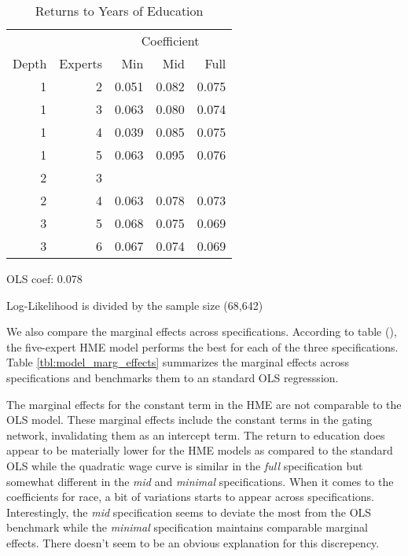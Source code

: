 \documentclass[12pt]{article}
\begin{document}
\begin{table} \centering
  \caption{Returns to Years of Education}
  \begin{threeparttable}
    \begin{tabular}[l]{r r r r r}
  \cmidrule{1-5}
        &         & \multicolumn{3}{c}{Coefficient} \\ 
  \cmidrule(r){3-5}
  Depth & Experts & Min   & Mid   & Full       \\
  \cmidrule{1-5}

  1     & 2       & 0.051 & 0.082 & 0.075     \\
  1     & 3       & 0.063 & 0.080 & 0.074     \\
  1     & 4       & 0.039 & 0.085 & 0.075      \\
  1     & 5       & 0.063 & 0.095 & 0.076      \\
  2     & 3       &  &  &      \\
  2     & 4       & 0.063 & 0.078 & 0.073      \\
  3     & 5       & 0.068 & 0.075 & 0.069      \\
  3     & 6       & 0.067 & 0.074 & 0.069      \\

  \hline
    \end{tabular}
    \begin{tablenotes}
      \item{\footnotesize OLS coef: 0.078}
      \item{\footnotesize Log-Likelihood is divided by the sample size (68,642)}
    \end{tablenotes} \label{tbl:YrsEdu_coef}
  \end{threeparttable}
\end{table}

We also compare the marginal effects across specifications. According to table
(), the five-expert HME model performs the best for each
of the three specifications. Table \ref{tbl:model_marg_effects} summarizes
the marginal effects across specifications and benchmarks them to an standard
OLS regresssion.

The marginal effects for the constant term in the HME are not comparable
to the OLS model. These marginal effects include the constant terms in the
gating network, invalidating them as an intercept term. The return to
education does appear to be materially lower for the HME models as
compared to the standard OLS while the quadratic wage curve is similar
in the \textit{full} specification but somewhat different in the
\textit{mid} and \textit{minimal} specifications. When it comes to
the coefficients for race, a bit of variations starts to appear
across specifications. Interestingly, the \textit{mid} specification
seems to deviate the most from the OLS benchmark while the
\textit{minimal} specification maintains comparable marginal effects.
There doesn't seem to be an obvious explanation for this discrepency. 
\end{document}
